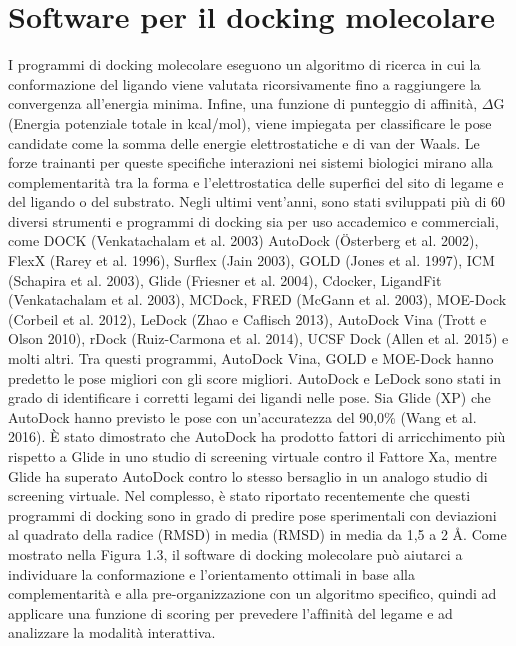 \section{Software per il docking molecolare}
I programmi di docking molecolare eseguono un algoritmo di ricerca in cui la conformazione del ligando viene valutata ricorsivamente fino a raggiungere la convergenza all'energia minima. Infine, una funzione di punteggio di affinità, $\Delta$G (Energia potenziale totale in kcal/mol), viene impiegata per classificare le pose candidate come la somma delle energie elettrostatiche e di van der Waals. Le forze trainanti per queste specifiche interazioni nei sistemi biologici mirano alla complementarità tra la forma e l'elettrostatica delle superfici del sito di legame e del ligando o del substrato. \newline
Negli ultimi vent'anni, sono stati sviluppati più di 60 diversi strumenti e programmi di docking sia per uso accademico e commerciali, come DOCK (Venkatachalam et al. 2003) AutoDock (Österberg et al. 2002), FlexX (Rarey et al. 1996), Surflex (Jain 2003), GOLD (Jones et al. 1997), ICM (Schapira et al. 2003), Glide (Friesner et al. 2004), Cdocker, LigandFit (Venkatachalam et al. 2003), MCDock, FRED (McGann et al. 2003), MOE-Dock (Corbeil et al. 2012), LeDock (Zhao e Caflisch 2013), AutoDock Vina (Trott e Olson 2010), rDock (Ruiz-Carmona et al. 2014), UCSF Dock (Allen et al. 2015) e molti altri. \newline 
Tra questi programmi, AutoDock Vina, GOLD e MOE-Dock hanno predetto le pose migliori con gli score migliori. AutoDock e LeDock sono stati in grado di identificare i corretti legami dei ligandi nelle pose. Sia Glide (XP) che AutoDock hanno previsto le pose con un'accuratezza del 90,0\% (Wang et al. 2016). È stato dimostrato che AutoDock ha prodotto fattori di arricchimento più rispetto a Glide in uno studio di screening virtuale contro il Fattore Xa, mentre Glide ha superato AutoDock contro lo stesso bersaglio in un analogo studio di screening virtuale. Nel complesso, è stato riportato recentemente che questi programmi di docking sono in grado di predire pose sperimentali con deviazioni al quadrato della radice (RMSD) in media (RMSD) in media da 1,5 a 2 Å\cite{pagadala2017software}.\newline 
Come mostrato nella Figura 1.3, il software di docking molecolare può aiutarci a individuare la conformazione e l'orientamento ottimali in base alla complementarità e alla pre-organizzazione con un algoritmo specifico, quindi ad applicare una funzione di scoring per prevedere l'afﬁnità del legame e ad analizzare la modalità interattiva\cite{fan2019progress}.

